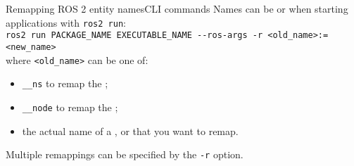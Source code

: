 \begin{frame}{Remapping ROS 2 entity names}{CLI commands}
  Names can be  or  when starting applications with \texttt{ros2 run}:\\
  \bigskip
  \texttt{ros2 run PACKAGE\_NAME EXECUTABLE\_NAME -{}-ros-args -r <old\_name>:=<new\_name>}\\
  \bigskip
  where \texttt{<old\_name>} can be one of:
  \begin{itemize}
    \item \texttt{\_{}\_ns} to remap the ;
    \item \texttt{\_{}\_node} to remap the ;
    \item the actual name of a ,  or  that you want to remap.
  \end{itemize}
  \vspace{10pt}
  Multiple remappings can be specified by  the \texttt{-r} option.
\end{frame}
